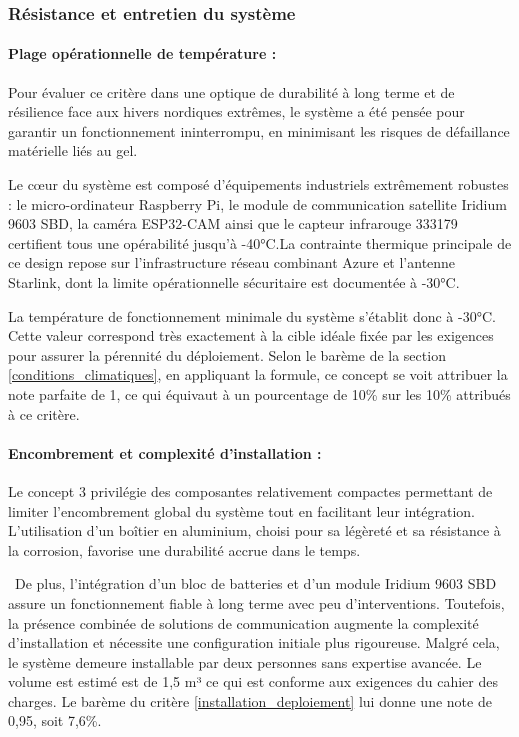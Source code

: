 \subsubsection{Résistance et entretien du système}

\paragraph{Plage opérationnelle de température :}
Pour évaluer ce critère dans une optique de durabilité à long terme et de résilience face aux hivers nordiques extrêmes, le système a été pensée pour garantir un fonctionnement ininterrompu, en minimisant les risques de défaillance matérielle liés au gel. 

\bigskip
Le cœur du système est composé d'équipements industriels extrêmement robustes : le micro-ordinateur Raspberry Pi, le module de communication satellite Iridium 9603 SBD, la caméra ESP32-CAM ainsi que le capteur infrarouge 333179 certifient tous une opérabilité jusqu'à -40°C.La contrainte thermique principale de ce design repose sur l'infrastructure réseau combinant Azure et l'antenne Starlink, dont la limite opérationnelle sécuritaire est documentée à -30°C. 

\bigskip
La température de fonctionnement minimale du système s'établit donc à -30°C. Cette valeur correspond très exactement à la cible idéale fixée par les exigences pour assurer la pérennité du déploiement. Selon le barème de la section \ref{conditions_climatiques}, en appliquant la formule, ce concept se voit attribuer la note parfaite de 1, ce qui équivaut à un pourcentage de 10\% sur les 10\% attribués à ce critère. 

\paragraph{Encombrement et complexité d'installation :}
Le concept 3 privilégie des composantes relativement compactes permettant de limiter l’encombrement global du système tout en facilitant leur intégration. L’utilisation d’un boîtier en aluminium, choisi pour sa légèreté et sa résistance à la corrosion, favorise une durabilité accrue dans le temps. 

\bigskip
 De plus, l’intégration d’un bloc de batteries et d’un module Iridium 9603 SBD assure un fonctionnement fiable à long terme avec peu d’interventions. Toutefois, la présence combinée de solutions de communication augmente la complexité d’installation et nécessite une configuration initiale plus rigoureuse.
 Malgré cela, le système demeure installable par deux personnes sans expertise avancée. Le volume est estimé est de 1,5 m³ ce qui est conforme aux exigences du cahier des charges.
 Le barème du critère \ref{installation_deploiement} lui donne une note de 0,95, soit 7,6\%. 


